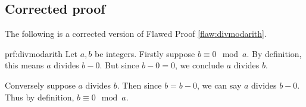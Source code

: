 \clearpage
\subsection{Corrected proof}

The following is a corrected version of Flawed Proof \ref{flaw:divmodarith}. %

\begin{prf}{prf:divmodarith} %
Let $a,b$ be integers. Firstly suppose $b \equiv 0 \mod a$. By definition, this means $a$ divides $b-0$. But since $b-0 = 0$, we conclude $a$ divides $b$. 

Conversely suppose $a$ divides $b$. Then since $b = b-0$, we can say $a$ divides $b-0$. Thus by definition, $b \equiv 0 \mod a$.  
\end{prf}